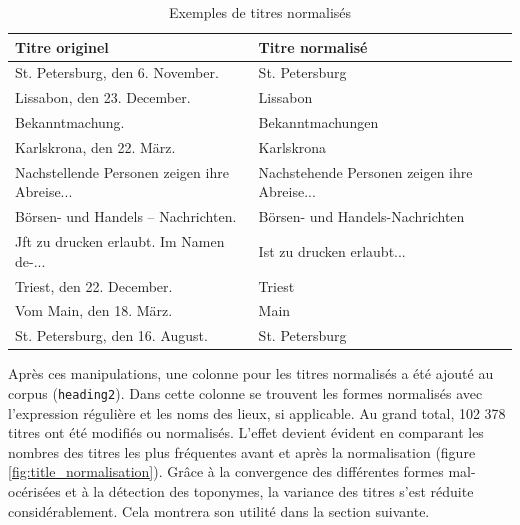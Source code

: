 \documentclass[a4paper,twoside,12pt]{article}
\begin{document}
\begin{table}[]
    \centering
    \small
    \begin{tabular}{lll}
\toprule
                               Titre originel &                                           Titre normalisé \\
\midrule
                   St. Petersburg, den 6. November. &                                     St. Petersburg \\
                        Lissabon, den 23. December. &                                           Lissabon \\
                                    Bekanntmachung. &                                   Bekanntmachungen \\
                          Karlskrona, den 22. März. &                                         Karlskrona \\
      Nachstellende Personen zeigen ihre Abreise... &       Nachstehende Personen zeigen ihre Abreise... \\
                 Börsen- und Handels – Nachrichten. &                    Börsen- und Handels-Nachrichten \\
            Jft zu drucken erlaubt. Im Namen de-... &                          Ist zu drucken erlaubt... \\
                          Triest, den 22. December. &                                             Triest \\
                            Vom Main, den 18. März. &                                               Main \\
                    St. Petersburg, den 16. August. &                                     St. Petersburg \\
\bottomrule
\end{tabular}
    \caption{Exemples de titres normalisés}
    \label{table:titles_normalised}
\end{table}

Après ces manipulations, une colonne pour les titres normalisés a été ajouté au corpus (\texttt{heading2}). Dans cette colonne se trouvent les formes normalisés avec l'expression régulière et les noms des lieux, si applicable. Au grand total, 102 378 titres ont été modifiés ou normalisés. L'effet devient évident en comparant les nombres des titres les plus fréquentes avant et après la normalisation (figure \ref{fig:title_normalisation}). Grâce à la convergence des différentes formes mal-océrisées et à la détection des toponymes, la variance des titres s'est réduite considérablement. Cela montrera son utilité dans la section suivante.
\end{document}
